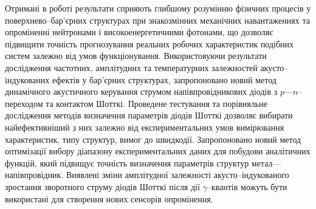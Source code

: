 {\influenceTXT}
Отримані в роботі результати сприяють глибшому розумінню фізичних процесів у поверхнево--бар'єрних структурах при
знакозмінних механічних навантаженнях та опроміненні нейтронами і високоенергетичними фотонами, що
дозволяє підвищити точність прогнозування реальних робочих характеристик подібних систем залежно від умов функціонування.
Використовуючи результати дослідження частотних, амплітудних та температурних залежностей акусто--індукованих ефектів у бар'єрних структурах,
запропоновано новий метод динамічного акустичного керування струмом напівпровідникових діодів з $p$---$n$--переходом та контактом Шотткі.
Проведене тестування та порівняльне дослідження методів визначення параметрів діодів Шотткі дозволяє вибирати найефективніший з них залежно
від експериментальних умов вимірювання характеристик, типу структур, вимог до швидкодії.
Запропоновано новий метод оптимізації вибору діапазону експериментальних даних для побудови аналітичних функцій, який підвищує точність визначення параметрів структур метал---напівпровідник.
Виявлені зміни амплітудної залежності акусто--індукованого зростання зворотного струму  діодів Шотткі
 після дії $\gamma$--квантів
можуть бути використані для створення нових сенсорів опромінення.




